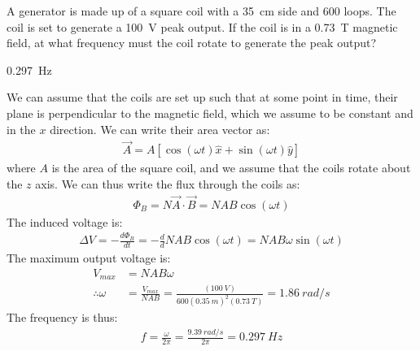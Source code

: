 \question A generator is made up of a square coil with a \SI{35}{cm} side and 600 loops. The coil is set to generate a \SI{100}{V} peak output. If the coil is in a \SI{0.73}{T} magnetic field, at what frequency must the coil rotate to generate the peak output?
\begin{finalanswer}
\SI{0.297}{Hz}
\end{finalanswer}
\begin{solution}
We can assume that the coils are set up such that at some point in time, their plane is perpendicular to the magnetic field, which we assume to be constant and in the $x$ direction. We can write their area vector as:
\begin{align*}
\vec A=A[\cos(\omega t)\hat x +\sin(\omega t) \hat y]
\end{align*}
where $A$ is the area of the square coil, and we assume that the coils rotate about the $z$ axis. We can thus write the flux through the coils as:
\begin{align*}
\Phi_B=N\vec A\cdot \vec B=NAB\cos(\omega t)
\end{align*}
The induced voltage is:
\begin{align*}
\Delta V=-\frac{d\Phi_B}{dt}=-\frac{d}{d}NAB\cos(\omega t)=NAB\omega\sin(\omega t)
\end{align*}
The maximum output voltage is:
\begin{align*}
V_{max}&=NAB\omega\\
\therefore \omega &=\frac{V_{max}}{NAB}=\frac{(\SI{100}{V})}{600(\SI{0.35}{m})^2(\SI{0.73}{T})}=\SI{1.86}{rad/s}
\end{align*}
The frequency is thus:
\begin{align*}
f=\frac{\omega}{2\pi}=\frac{\SI{9.39}{rad/s}}{2\pi}=\SI{0.297}{Hz}
\end{align*}
\end{solution}

